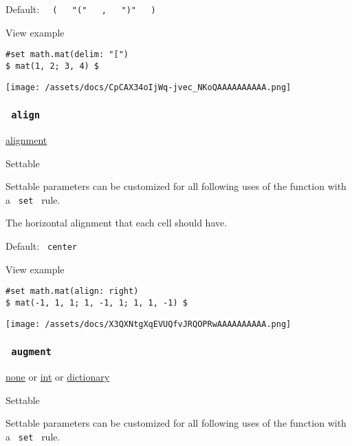 Default:
\texttt{\ }{\texttt{\ (\ }}\texttt{\ }{\texttt{\ "("\ }}\texttt{\ }{\texttt{\ ,\ }}\texttt{\ }{\texttt{\ ")"\ }}\texttt{\ }{\texttt{\ )\ }}\texttt{\ }


View example

\begin{verbatim}
#set math.mat(delim: "[")
$ mat(1, 2; 3, 4) $
\end{verbatim}

\texttt{[image: /assets/docs/CpCAX34oIjWq-jvec\_NKoQAAAAAAAAAA.png]}

\subsubsection{\texorpdfstring{\texttt{\ align\ }}{ align }}\label{parameters-align}

\href{/docs/reference/layout/alignment/}{alignment}

{{ Settable }}

\label{parameters-align-settable-tooltip}
Settable parameters can be customized for all following uses of the
function with a \texttt{\ set\ } rule.

The horizontal alignment that each cell should have.

Default: \texttt{\ center\ }


View example

\begin{verbatim}
#set math.mat(align: right)
$ mat(-1, 1, 1; 1, -1, 1; 1, 1, -1) $
\end{verbatim}

\texttt{[image: /assets/docs/X3QXNtgXqEVUQfvJRQOPRwAAAAAAAAAA.png]}

\subsubsection{\texorpdfstring{\texttt{\ augment\ }}{ augment }}\label{parameters-augment}

\href{/docs/reference/foundations/none/}{none} {or}
\href{/docs/reference/foundations/int/}{int} {or}
\href{/docs/reference/foundations/dictionary/}{dictionary}

{{ Settable }}

\label{parameters-augment-settable-tooltip}
Settable parameters can be customized for all following uses of the
function with a \texttt{\ set\ } rule.

